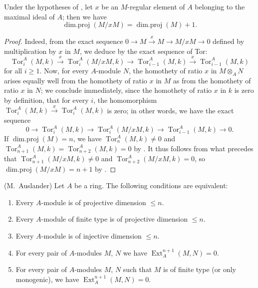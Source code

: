 \begin{corollary}[17.2.7]
\label{0.17.2.7}
Under the hypotheses of , let $x$ be an $M$-regular element of $A$ belonging to the maximal ideal of $A$; then we have
\[
\label{0.17.2.7.1}
  \operatorname{dim.proj}(M/xM)=\operatorname{dim.proj}(M)+1.
  \tag{17.2.7.1}
\]
\end{corollary}

\begin{proof}
Indeed, from the exact sequence $0\to M\xrightarrow{x}M\to M/xM\to 0$ defined by multiplication by $x$ in $M$, we deduce by the exact sequence of Tor:
\[
  \operatorname{Tor}^A_i(M,k)\xrightarrow{x}\operatorname{Tor}^A_i(M/xM,k)\to\operatorname{Tor}^A_{i-1}(M,k)\xrightarrow{x}\operatorname{Tor}^A_{i-1}(M,k)
\]
for all $i\geq 1$.
Now, for every $A$-module $N$, the homothety of ratio $x$ in $M\otimes_A N$ arises equally well from the homothety of ratio $x$ in $M$ as from the homothety of ratio $x$ in $N$;
we conclude immediately, since the homothety of ratio $x$ in $k$ is zero by definition, that for every $i$, the homomorphism $\operatorname{Tor}^A_i(M,k)\xrightarrow{x}\operatorname{Tor}^A_i(M,k)$ is zero;
in other words, we have the exact sequence
\[
  0\to\operatorname{Tor}^A_i(M,k)\to\operatorname{Tor}^A_i(M/xM,k)\to\operatorname{Tor}^A_{i-1}(M,k)\to 0.
\]
If $\operatorname{dim.proj}(M)=n$, we have $\operatorname{Tor}^A_n(M,k)\neq 0$ and $\operatorname{Tor}^A_{n+1}(M,k)=\operatorname{Tor}^A_{n+2}(M,k)=0$ by .
It thus follows from what precedes that $\operatorname{Tor}^A_{n+1}(M/xM,k)\neq 0$ and $\operatorname{Tor}^A_{n+2}(M/xM,k)=0$, so $\operatorname{dim.proj}(M/xM)=n+1$ by .
\end{proof}

\begin{proposition}[17.2.8]
\label{0.17.2.8}
\textnormal{(M.~Auslander)}
Let $A$ be a ring.
The following conditions are equivalent:
\begin{enumerate}
  \item[{\rm a)}] Every $A$-module is of projective dimension $\leq n$.
  \item[{\rm a')}] Every $A$-module of finite type is of projective dimension $\leq n$.
  \item[{\rm b)}] Every $A$-module is of injective dimension $\leq n$.
  \item[{\rm c)}] For every pair of $A$-modules $M$, $N$ we have $\operatorname{Ext}^{n+1}_A(M,N)=0$.
  \item[{\rm c')}] For every pair of $A$-modules $M$, $N$ such that $M$ is of finite type \textup{(or only} monogenic\textup{)}, we have $\operatorname{Ext}^{n+1}_A(M,N)=0$.
\end{enumerate}
\end{proposition}

